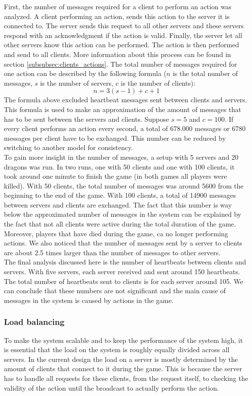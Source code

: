 		First, the number of messages required for a client to perform an action was analyzed. 
		A client performing an action, sends this action to the server it is connected to. 
		The server sends this request to all other servers and these servers respond with an acknowledgment if the action is valid. 
		Finally, the server let all other servers know this action can be performed. 
		The action is then performed and send to all clients. 
		More information about this process can be found in section \ref{subsubsec:clients_actions}. 
		The total number of messages required for one action can be described by the following formula ($ n $ is the total number of messages, $ s $ is the number of servers, $ c $ is the number of clients):
		$$ n = 3(s - 1) + c + 1 $$
		The formula above excluded heartbeat messages sent between clients and servers.
		This formula is used to make an approximation of the amount of messages that has to be sent between the servers and clients. 
		Suppose $ s = 5 $ and $ c = 100 $. 
		If every client performs an action every second, a total of 678.000 messages or 6780 messages per client have to be exchanged. 
		This number can be reduced by switching to another model for consistency.\\
		To gain more insight in the number of messages, a setup with 5 servers and 20 dragons was run. 
		In two runs, one with 50 clients and one with 100 clients, it took around one minute to finish the game (in both games all players were killed). 
		With 50 clients, the total number of messages was around 5600 from the beginning to the end of the game. 
		With 100 clients, a total of 14900 messages between servers and clients are exchanged. 
		The fact that this number is way below the approximated number of messages in the system can be explained by the fact that not all clients were active during the total duration of the game. 
		Moreover, players that have died during the game, ca no longer performing actions. We also noticed that the number of messages sent by a server to clients are about 2.5 times larger than the number of messages to other servers.\\
		The final analysis discussed here is the number of heartbeats between clients and servers. 
		With five servers, each server received and sent around 150 heartbeats. 
		The total number of heartbeats sent to clients is for each server around 105. 
		We can conclude that these numbers are not significant and the main cause of messages in the system is caused by actions in the game.

\subsubsection{Load balancing}
\label{subsubsec:exp_load}
To make the system scalable and to keep the performance of the system high, it is essential that the load on the system is roughly equally divided across all servers.
In the current design the load on a server is mostly determined by the amount of clients that connect to it during the game. 
This is because the server has to handle all requests for these clients, from the request itself, to checking the validity of the action until the broadcast to actually perform the action.

